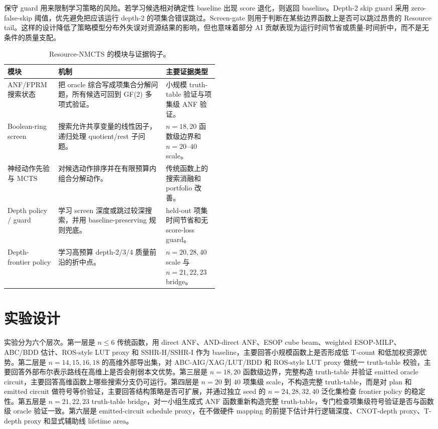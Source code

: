 \documentclass[UTF8,fontset=macnew,11pt]{ctexart}
\newcommand{\method}{Resource-NMCTS}
\newcommand{\anf}{\ensuremath{\mathrm{ANF}}}
\newcommand{\mcts}{\ensuremath{\mathrm{MCTS}}}
\newcommand{\ttable}{truth-table}
\begin{document}
保守 guard 用来限制学习策略的风险。若学习候选相对确定性 baseline 出现 score 退化，则返回 baseline。Depth-2 skip guard 采用 zero-false-skip 阈值，优先避免把应该运行 depth-2 的项集合错误跳过。Screen-gate 则用于判断在某些边界函数上是否可以跳过昂贵的 Resource tail。这样的设计降低了策略模型分布外失误对资源结果的影响，但也意味着部分 AI 贡献表现为运行时间节省或质量-时间折中，而不是无条件的质量支配。

\begin{table}[H]
\centering
\small
\caption{\method{} 的模块与证据钩子。}
\label{tab:modules}
\begin{tabularx}{\linewidth}{>{\raggedright\arraybackslash}p{0.24\linewidth}>{\raggedright\arraybackslash}X>{\raggedright\arraybackslash}p{0.25\linewidth}}
\toprule
模块 & 机制 & 主要证据类型 \\
\midrule
ANF/FPRM 搜索状态 & 把 oracle 综合写成项集合分解问题，所有候选可回到 GF(2) 多项式验证。 & 小规模 truth-table 验证与项集级 ANF 验证。 \\
Boolean-ring screen & 搜索允许共享变量的线性因子，递归处理 quotient/rest 子问题。 & $n=18,20$ 函数级边界和 $n=20$--$40$ scale。 \\
神经动作先验与 \mcts{} & 对候选动作排序并在有限预算内组合分解动作。 & 传统函数上的搜索消融和 portfolio 改善。 \\
Depth policy / guard & 学习 screen 深度或跳过较深搜索，并用 baseline-preserving 规则兜底。 & held-out 项集时间节省和无 score-loss guard。 \\
Depth-frontier policy & 学习高预算 depth-2/3/4 质量前沿的折中点。 & $n=20,28,40$ scale 与 $n=21,22,23$ bridge。 \\
\bottomrule
\end{tabularx}
\end{table}

\section{实验设计}

实验分为六个层次。第一层是 $n\leq6$ 传统函数，用 direct ANF、AND-direct ANF、ESOP cube beam、weighted ESOP-MILP、ABC/BDD 估计、ROS-style LUT proxy 和 SSHR-H/SSHR-I 作为 baseline，主要回答小规模函数上是否形成低 T-count 和低加权资源优势。第二层是 $n=14,15,16,18$ 的高维外部导出集，对 ABC-AIG/XAG/LUT/BDD 和 ROS-style LUT proxy 做统一 truth-table 校验，主要回答外部布尔表示路线在高维上是否会削弱本文优势。第三层是 $n=18,20$ 函数级边界，完整构造 \ttable{} 并验证 emitted oracle circuit，主要回答高维函数上哪些搜索分支仍可运行。第四层是 $n=20$ 到 $40$ 项集级 scale，不构造完整 \ttable{}，而是对 plan 和 emitted circuit 做符号等价验证，主要回答结构策略是否可扩展，并通过独立 seed 的 $n=24,28,32,40$ 泛化集检查 frontier policy 的稳定性。第五层是 $n=21,22,23$ truth-table bridge，对一小组生成式 \anf{} 函数重新构造完整 \ttable{}，专门检查项集级符号验证是否与函数级 oracle 验证一致。第六层是 emitted-circuit schedule proxy，在不做硬件 mapping 的前提下估计并行逻辑深度、CNOT-depth proxy、T-depth proxy 和显式辅助线 lifetime area。
\end{document}
